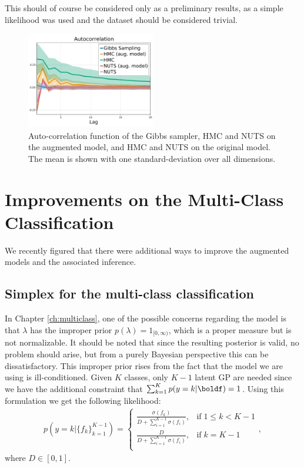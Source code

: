 This should of course be considered only as a preliminary results, as a simple likelihood was used and the dataset should be considered trivial.

\begin{figure}
    \centering
    \includegraphics[width=0.5\textwidth]{./chapters/8_discussions/figures/autocorrelation.pdf}
    \caption{Auto-correlation function of the Gibbs sampler, \ac{HMC} and \ac{NUTS} on the augmented model, and \ac{HMC} and \ac{NUTS} on the original model.
    The mean is shown with one standard-deviation over all dimensions.}
    \label{fig:hmc_vs_gibbs}
\end{figure}


\section{Improvements on the Multi-Class Classification}
\label{sec:improvemulticlass}
We recently figured that there were additional ways to improve the augmented models and the associated inference.

\subsection{Simplex for the multi-class classification}
\label{sec:simplex}
In Chapter \ref{ch:multiclass}, one of the possible concerns regarding the model is that $\lambda$ has the improper prior $p(\lambda) = 1_{[0,\infty)}$, which is a proper measure but is not normalizable.
It should be noted that since the resulting posterior is valid, no problem should arise, but from a purely Bayesian perspective this can be dissatisfactory.
This improper prior rises from the fact that the model we are using is ill-conditioned.
Given $K$ classes, only $K-1$ latent \ac{GP} are needed since we have the additional constraint that $\sum_{k=1}^K p(y=k|\boldf) = 1$.
Using this formulation we get the following likelihood:
\begin{align}
    p(y=k|\{f_k\}_{k=1}^{K-1}) = \left\{
        \begin{array}{cc}
            \frac{\sigma(f_k)}{D + \sum_{i=1}^{K-1}\sigma(f_i)}, & \mathrm{if}\; 1 \leq k < K - 1\\
            \frac{D}{D + \sum_{i=1}^{K-1}\sigma(f_i)}, & \mathrm{if}\; k = K - 1 \\
    \end{array}
    \right.,
\end{align}
where $D \in [0, 1]$.

